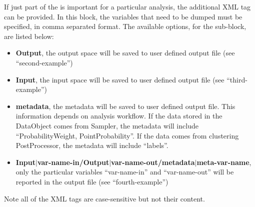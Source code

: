 If just part of the  is important for a particular analysis, the
additional XML tag  can be provided.
%
In this block, the variables that need to be dumped must be specified, in
comma separated format.
%
The available options, for the  sub-block, are listed below:
\vspace{-5mm}
\begin{itemize}
  \itemsep0em
  \item \textbf{Output}, the output space will be saved to user defined output file (see
  ``second-example'')
  \item \textbf{Input}, the input space will be saved to user defined output file (see
  ``third-example'')
  \item \textbf{metadata}, the metadata will be saved to user defined output file. This information
  depends on analysis workflow. If the data stored in the DataObject comes from Sampler,
  the metadata will include ``ProbabilityWeight, PointProbability''. If the data comes from
  clustering PostProcessor, the metadata will include ``labels''.
  \item \textbf{Input$|$var-name-in/Output$|$var-name-out/metadata$|$meta-var-name}, only the particular
  variables ``var-name-in'' and ``var-name-out'' will be reported in the output
  file (see ``fourth-example'')
\end{itemize}
\vspace{-5mm}
Note all of the XML tags are case-sensitive but not their content.

